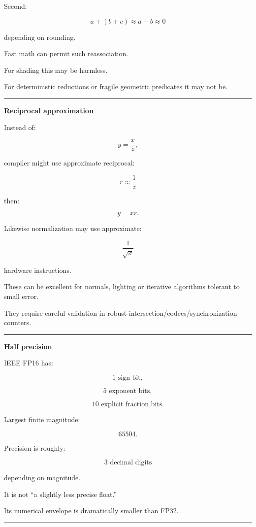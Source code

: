 Second:

\[
a+(b+c)
\approx
a-b
\approx0
\]

depending on rounding.

Fast math can permit such reassociation.

For shading this may be harmless.

For deterministic reductions or fragile geometric predicates it may not be.

\begin{center}\rule{0.5\linewidth}{0.5pt}\end{center}

\textbf{Reciprocal approximation}

Instead of:

\[
y=\frac{x}{z},
\]

compiler might use approximate reciprocal:

\[
r\approx\frac1z
\]

then:

\[
y=xr.
\]

Likewise normalization may use approximate:

\[
\frac1{\sqrt{x}}
\]

hardware instructions.

These can be excellent for normals, lighting or iterative algorithms tolerant to small error.

They require careful validation in robust intersection/codecs/synchronization counters.

\begin{center}\rule{0.5\linewidth}{0.5pt}\end{center}

\textbf{Half precision}

IEEE FP16 has:

\[
1\text{ sign bit},
\]

\[
5\text{ exponent bits},
\]

\[
10\text{ explicit fraction bits}.
\]

Largest finite magnitude:

\[
65504.
\]

Precision is roughly:

\[
3\text{ decimal digits}
\]

depending on magnitude.

It is not ``a slightly less precise float.''

Its numerical envelope is dramatically smaller than FP32.

\begin{center}\rule{0.5\linewidth}{0.5pt}\end{center}

